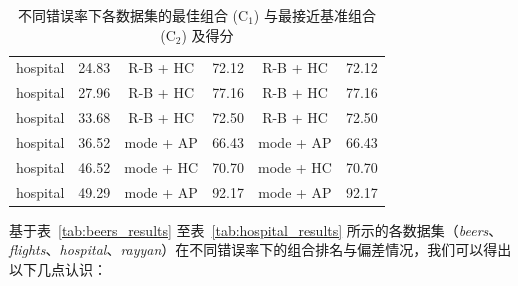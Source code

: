 \documentclass[10pt]{article} %
\numberwithin{equation}{section}
\begin{document}
\begin{table}[htbp]
\begin{subtable}{0.48\linewidth}
\begin{tabular}{lccccc}
            hospital & 24.83 & R-B + HC  & 72.12  & R-B + HC  & 72.12  \\
            hospital & 27.96 & R-B + HC  & 77.16  & R-B + HC  & 77.16  \\
            hospital & 33.68 & R-B + HC  & 72.50  & R-B + HC  & 72.50  \\
            hospital & 36.52 & mode + AP & 66.43  & mode + AP & 66.43  \\
            hospital & 46.52 & mode + HC & 70.70  & mode + HC & 70.70  \\
            hospital & 49.29 & mode + AP & 92.17  & mode + AP & 92.17  \\
            \bottomrule
        \end{tabular}
    \end{subtable}

    \caption{不同错误率下各数据集的最佳组合 (C$_1$) 与最接近基准组合 (C$_2$) 及得分}
    \label{tab:all_results}
\end{table}

\vspace{0.5em}
\noindent
基于表~\ref{tab:beers_results} 至表~\ref{tab:hospital_results} 所示的各数据集（\textit{beers}、\textit{flights}、\textit{hospital}、\textit{rayyan}）在不同错误率下的组合排名与偏差情况，我们可以得出以下几点认识：
\end{document}
